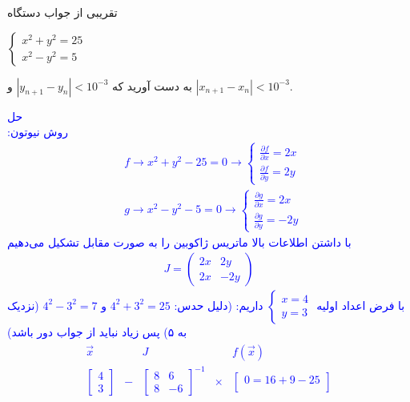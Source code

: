 تقریبی از جواب دستگاه
\begin{center}
$
    \begin{cases}
    x^2 + y^2 = 25 \\
    x^2 - y^2 = 5
    \end{cases}
$
\end{center}
به دست آورید که 
$|y_{n+1} - y_n| < 10^{-3}$
و
$|x_{n+1} - x_n| < 10^{-3}$.

\textcolor{blue}{
حل 
\\
روش نیوتون:
\begin{align*}
    &f \rightarrow x^2  + y^2 - 25= 0 \rightarrow \begin{cases}
        \frac{\partial f}{\partial x} = 2x \\
        \frac{\partial f}{\partial y} = 2y
    \end{cases}
    \\
    &g \rightarrow x^2 - y^2 - 5 = 0 \rightarrow 
    \begin{cases}
        \frac{\partial g}{\partial x} = 2x \\
        \frac{\partial g}{\partial y} = -2y
    \end{cases}
\end{align*}
با داشتن اطلاعات بالا ماتریس ژاکوبین را به صورت مقابل تشکیل می‌دهیم
\begin{align*}
    J = \begin{pmatrix}
        2x & 2y \\
        2x & -2y
    \end{pmatrix}
\end{align*}
با فرض اعداد اولیه 
$\begin{cases}
    x = 4 \\
    y = 3
\end{cases}$
داریم:
(دلیل حدس:
$4^2 + 3^2 = 25$
و
$4^2 - 3^2 = 7$
(نزدیک به ۵)
پس زیاد نباید از جواب دور باشد)
\begin{align*}
    &\begin{array}{ccccccc}
\overrightarrow{x} & & J & & f(\overrightarrow{x}) & \\
\begin{bmatrix}
    4 \\
    3
\end{bmatrix} & - & 
\begin{bmatrix}
    8 &  6  \\
    8 & -6
\end{bmatrix}^{-1} & \times &
\begin{bmatrix}
    0 = 16 + 9 - 25 \\

\end{bmatrix}
\end{array}
\end{align*}}
